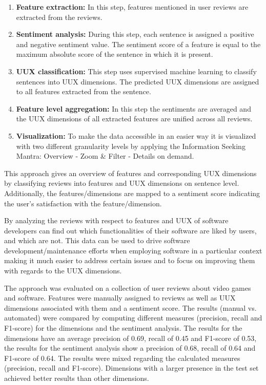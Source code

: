\begin{enumerate}
    \item \textbf{Feature extraction:} In this step, features mentioned in user reviews are extracted from the reviews.
    \item \textbf{Sentiment analysis:} During this step, each sentence is assigned a positive and negative sentiment value. The sentiment score of a feature is equal to the maximum absolute score of the sentence in which it is present.
    \item \textbf{UUX classification:} This step uses supervised machine learning to classify sentences into UUX dimensions. The predicted UUX dimensions are assigned to all features extracted from the sentence.
    \item \textbf{Feature level aggregation:} In this step the sentiments are averaged and the UUX dimensions of all extracted features are unified across all reviews.
    \item \textbf{Visualization:} To make the data accessible in an easier way it is visualized with two different granularity levels by applying the Information Seeking Mantra: Overview - Zoom \& Filter - Details on demand.
\end{enumerate}

This approach gives an overview of features and corresponding UUX dimensions by classifying reviews into features and UUX dimensions on sentence level. Additionally, the features/dimensions are mapped to a sentiment score indicating the user's satisfaction with the feature/dimension.

By analyzing the reviews with respect to features and UUX of software developers can find out which functionalities of their software are liked by users, and which are not. This data can be used to drive software development/maintenance efforts when employing software in a particular context making it much easier to address certain issues and to focus on improving them with regards to the UUX dimensions.

The approach was evaluated on a collection of user reviews about video games and software. Features were manually assigned to reviews as well as UUX dimensions associated with them and a sentiment score. The results (manual vs. automated) were compared by computing different measures (precision, recall and F1-score) for the dimensions and the sentiment analysis. The results for the dimensions have an average precision of 0.69, recall of 0.45 and F1-score of 0.53, the results for the sentiment analysis show a precision of 0.68, recall of 0.64 and F1-score of 0.64. The results were mixed regarding the calculated measures (precision, recall and F1-score). Dimensions with a larger presence in the test set achieved better results than other dimensions.

